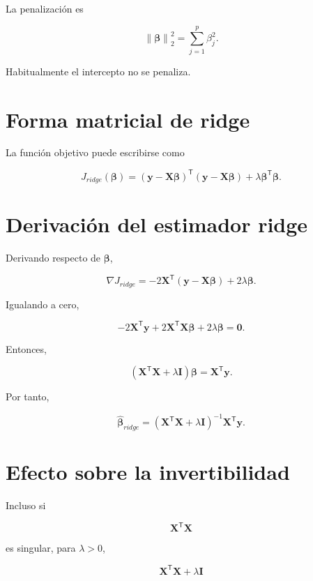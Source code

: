 \documentclass[
  spanish,
  11pt,
  letterpaper,
  DIV=11,
  numbers=noendperiod]{scrreprt}
\theoremstyle{definition}
\theoremstyle{plain}
\theoremstyle{definition}
\theoremstyle{remark}
\begin{document}
La penalización es

\[
\left\|
\boldsymbol{\beta}
\right\|_2^2
=
\sum_{j=1}^{p}
\beta_j^2.
\]

Habitualmente el intercepto no se penaliza.

\section{Forma matricial de ridge}\label{forma-matricial-de-ridge}

La función objetivo puede escribirse como

\[
J_{ridge}(\boldsymbol{\beta})
=
(\mathbf{y}-\mathbf{X}\boldsymbol{\beta})^{\mathsf T}
(\mathbf{y}-\mathbf{X}\boldsymbol{\beta})
+
\lambda
\boldsymbol{\beta}^{\mathsf T}\boldsymbol{\beta}.
\]

\section{Derivación del estimador
ridge}\label{derivaciuxf3n-del-estimador-ridge}

Derivando respecto de \(\boldsymbol{\beta}\),

\[
\nabla J_{ridge}
=
-2\mathbf{X}^{\mathsf T}
(\mathbf{y}-\mathbf{X}\boldsymbol{\beta})
+
2\lambda\boldsymbol{\beta}.
\]

Igualando a cero,

\[
-2\mathbf{X}^{\mathsf T}\mathbf{y}
+
2\mathbf{X}^{\mathsf T}\mathbf{X}\boldsymbol{\beta}
+
2\lambda\boldsymbol{\beta}
=
\mathbf{0}.
\]

Entonces,

\[
\left(
\mathbf{X}^{\mathsf T}\mathbf{X}
+
\lambda\mathbf{I}
\right)
\boldsymbol{\beta}
=
\mathbf{X}^{\mathsf T}\mathbf{y}.
\]

Por tanto,

\[
\widehat{\boldsymbol{\beta}}_{ridge}
=
\left(
\mathbf{X}^{\mathsf T}\mathbf{X}
+
\lambda\mathbf{I}
\right)^{-1}
\mathbf{X}^{\mathsf T}\mathbf{y}.
\]

\section{Efecto sobre la
invertibilidad}\label{efecto-sobre-la-invertibilidad}

Incluso si

\[
\mathbf{X}^{\mathsf T}\mathbf{X}
\]

es singular, para \(\lambda>0\),

\[
\mathbf{X}^{\mathsf T}\mathbf{X}
+
\lambda\mathbf{I}
\]
\end{document}
